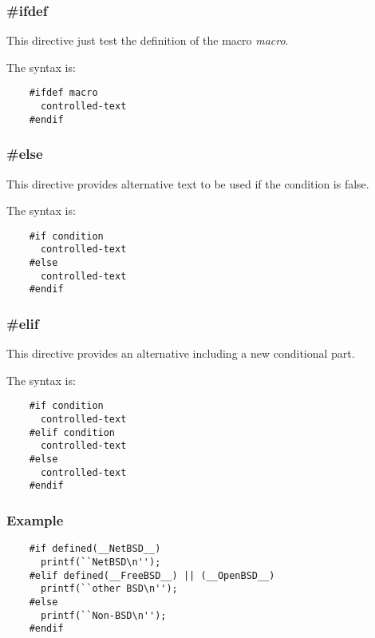\documentclass[9pt]{beamer}
\newcommand{\nl}[0]{\vspace{0.4cm}}
\begin{document}

\begin{frame}[containsverbatim]
  \frametitle{\textbf{\#ifdef}}

  This directive just test the definition of the macro \textit{macro}.

  \nl

  The syntax is:

  \begin{verbatim}
    #ifdef macro
      controlled-text
    #endif
  \end{verbatim}
\end{frame}


\begin{frame}[containsverbatim]
  \frametitle{\textbf{\#else}}

  This directive provides alternative text to be used if the condition
  is false.

  \nl

  The syntax is:

  \begin{verbatim}
    #if condition
      controlled-text
    #else
      controlled-text
    #endif
  \end{verbatim}
\end{frame}


\begin{frame}[containsverbatim]
  \frametitle{\textbf{\#elif}}

  This directive provides an alternative including a new conditional part.

  \nl

  The syntax is:

  \begin{verbatim}
    #if condition
      controlled-text
    #elif condition
      controlled-text
    #else
      controlled-text
    #endif
  \end{verbatim}
\end{frame}


\begin{frame}[containsverbatim]
  \frametitle{Example}

  \begin{verbatim}
    #if defined(__NetBSD__)
      printf(``NetBSD\n'');
    #elif defined(__FreeBSD__) || (__OpenBSD__)
      printf(``other BSD\n'');
    #else
      printf(``Non-BSD\n'');
    #endif
  \end{verbatim}
\end{frame}
\end{document}
